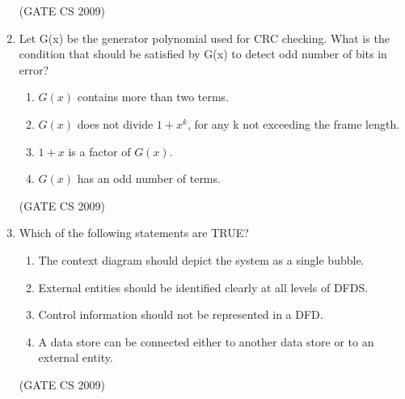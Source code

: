 \documentclass[a4paper, 11pt]{article}
\begin{document}
\begin{enumerate}
    \hfill (GATE CS 2009)

    \item  Let G(x) be the generator polynomial used for CRC checking. What is the condition that should be satisfied by G(x) to detect odd number of bits in error?
    \begin{enumerate} 
        \item $G(x)$ contains more than two terms.
        \item $G(x)$ does not divide $1+x^k$, for any k not exceeding the frame length.
        \item $1+x$ is a factor of $G(x)$.
        \item $G(x)$ has an odd number of terms.
    \end{enumerate}
    
    \hfill (GATE CS 2009)

    \item Which of the following statements are TRUE?\\
    \begin{enumerate}[label=\Roman*]
        \item The context diagram should depict the system as a single bubble.
        \item External entities should be identified clearly at all levels of DFDS.
        \item Control information should not be represented in a DFD.
        \item A data store can be connected either to another data store or to an external entity.
    \end{enumerate}
    
    \begin{enumerate}
    \end{enumerate}
    
    \hfill (GATE CS 2009)


\end{enumerate}
\end{document}
